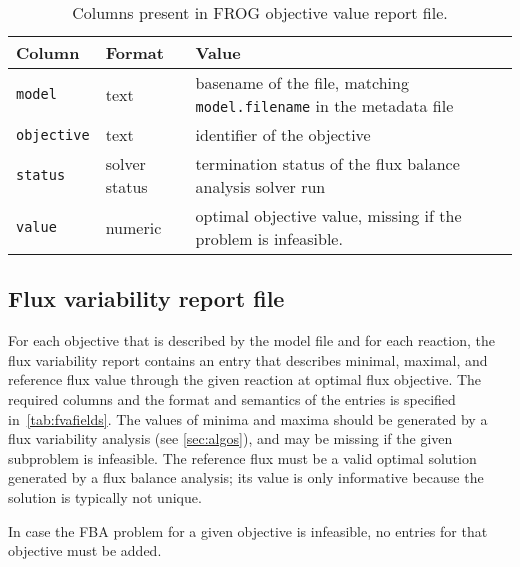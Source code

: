 \begin{table}[p]\tablefont
\begin{tabular}{llp{30em}}
\toprule
Column & Format & Value \\
\midrule
\verb|model|
 & text
 & basename of the file, matching \verb|model.filename| in the metadata file
 \\
\verb|objective|
 & text
 & identifier of the objective
 \\
\verb|status|
 & solver status
 & termination status of the flux balance analysis solver run
 \\
\verb|value|
 & numeric
 & optimal objective value, missing if the problem is infeasible.
 \\
\bottomrule
\end{tabular}
\caption{Columns present in FROG objective value report file.}
\label{tab:objfields}
\end{table}

\subsection{Flux variability report file}
\label{sec:fva}
For each objective that is described by the model file and for each reaction, the flux variability report contains an entry that describes minimal, maximal, and reference flux value through the given reaction at optimal flux objective. The required columns and the format and semantics of the entries is specified in~\cref{tab:fvafields}. The values of minima and maxima should be generated by a flux variability analysis (see \cref{sec:algos}), and may be missing if the given subproblem is infeasible. The reference flux must be a valid optimal solution generated by a flux balance analysis; its value is only informative because the solution is typically not unique.

In case the FBA problem for a given objective is infeasible, no entries for that objective must be added.




